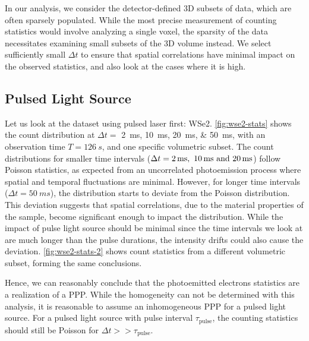 In our analysis, we consider the detector-defined 3D subsets of data, which are often sparsely populated. While the most precise measurement of counting statistics would involve analyzing a single voxel, the sparsity of the data necessitates examining small subsets of the 3D volume instead. We select sufficiently small $\Delta t$ to ensure that spatial correlations have minimal impact on the observed statistics, and also look at the cases where it is high.

\subsection*{Pulsed Light Source}
Let us look at the dataset using pulsed laser first: \gls{WSe2}. \cref{fig:wse2-stats} shows the count distribution at $\Delta t =$ \qtylist{2;10;20;50}{ms}, with an observation time $T=\qty{126}{s}$, and one specific volumetric subset. The count distributions for smaller time intervals ($\Delta t = \qtylist{2;10;20}{ms}$) follow Poisson statistics, as expected from an uncorrelated photoemission process where spatial and temporal fluctuations are minimal. However, for longer time intervals ($\Delta t = \qty{50}{ms}$), the distribution starts to deviate from the Poisson distribution. This deviation suggests that spatial correlations, due to the material properties of the sample, become significant enough to impact the distribution. While the impact of pulse light source should be minimal since the time intervals we look at are much longer than the pulse durations, the intensity drifts could also cause the deviation. \cref{fig:wse2-stats-2} shows count statistics from a different volumetric subset, forming the same conclusions.


Hence, we can reasonably conclude that the photoemitted electrons statistics are a realization of a \gls{PPP}. While the homogeneity can not be determined with this analysis, it is reasonable to assume an inhomogeneous \gls{PPP} for a pulsed light source. For a pulsed light source with pulse interval $\tau_{\text{pulse}}$, the counting statistics should still be Poisson for $\Delta t >> \tau_{\text{pulse}}$.

